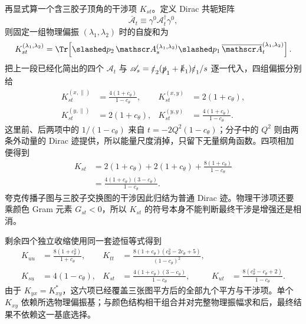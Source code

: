 \begin{derivation}
再显式算一个含三胶子顶角的干涉项 $K_{st}$。定义 Dirac 共轭矩阵
\begin{equation*}
 \overline{\mathscr A}_t
 \equiv\gamma^0\mathscr A_t^\dagger\gamma^0,
\end{equation*}
则固定一组物理偏振 $(\lambda_1,\lambda_2)$ 时的自旋和为
\begin{equation*}
 K_{st}^{(\lambda_1,\lambda_2)}
 =\Tr\!\left[
 \slashed p_2\,
 \mathscr A_s^{(\lambda_1,\lambda_2)}
 \slashed p_1\,
 \overline{\mathscr A}_t^{(\lambda_1,\lambda_2)}
 \right].
\end{equation*}
把上一段已经化简出的四个 $\mathscr A_t$ 与
$\mathscr A_s=\slashed\varepsilon_2(\slashed p_1+\slashed k_1)\slashed\varepsilon_1/s$
逐一代入，四组偏振分别给
\begin{align*}
 K_{st}^{(x,\parallel)}
 &=\frac{4(1+c_\theta)}{1-c_\theta},&
 K_{st}^{(x,y)}
 &=2(1+c_\theta),\\
 K_{st}^{(y,\parallel)}
 &=2(1+c_\theta),&
 K_{st}^{(y,y)}
 &=\frac{4(1+c_\theta)}{1-c_\theta}.
\end{align*}
这里前、后两项中的 $1/(1-c_\theta)$ 来自 $t=-2Q^2(1-c_\theta)$；分子中的 $Q^2$ 则由两条外动量的 Dirac 迹提供，所以能量尺度消掉，只留下无量纲角函数。四项相加便得到
\begin{align*}
 K_{st}
 &=2(1+c_\theta)
 +2(1+c_\theta)
 +\frac{8(1+c_\theta)}{1-c_\theta}\\
 &=\frac{4(1+c_\theta)(3-c_\theta)}{1-c_\theta}.
\end{align*}
夸克传播子图与三胶子交换图的干涉因此归结为普通 Dirac 迹。物理干涉项还要乘颜色 Gram 元素 $G_{st}<0$，所以 $K_{st}$ 的符号本身不能判断最终干涉是增强还是相消。

剩余四个独立收缩使用同一套迹恒等式得到
\begin{align*}
 K_{uu}&=\frac{8(1+c_\theta^2)}{1+c_\theta},&
 K_{tt}&=\frac{8(1+c_\theta)(c_\theta^2-2c_\theta+5)}{(1-c_\theta)^2},\\
 K_{su}&=4(1-c_\theta),&
 K_{st}&=\frac{4(1+c_\theta)(3-c_\theta)}{1-c_\theta},&
 K_{ut}&=\frac{8(c_\theta^2-c_\theta+2)}{1-c_\theta}.
\end{align*}
由于 $K_{yx}=K_{xy}^*$，这六项已经覆盖三张图平方后的全部九个平方与干涉项。单个 $K_{xy}$ 依赖所选物理偏振基；与颜色结构相干组合并对完整物理振幅求和后，最终结果不依赖这一基底选择。


\end{derivation}
